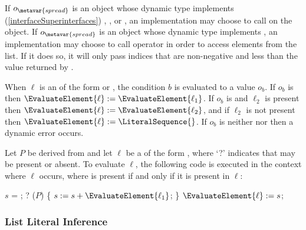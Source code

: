 \documentclass[makeidx]{article}
\begin{document}
{\LMHash{}%
If $o_{\metavar{spread}}$ is an object whose dynamic type implements
(\ref{interfaceSuperinterfaces})
, , or ,
an implementation may choose to call  on the object.
If $o_{\metavar{spread}}$ is an object
whose dynamic type implements ,
an implementation may choose to call operator \lit{[]}
in order to access elements from the list.
If it does so, it will only pass indices
that are non-negative and less than the value returned by .

\EndCase

\LMHash{}%
When $\ell$ is an  of the form
 or
,
the condition $b$ is evaluated to a value $o_b$.
If $o_b$ is \TRUE{} then
$\EvaluateElement{\ell} := \EvaluateElement{\ell_1}$.
If $o_b$ is \FALSE{} and $\ell_2$ is present then
$\EvaluateElement{\ell} := \EvaluateElement{\ell_2}$,
and if $\ell_2$ is not present then
$\EvaluateElement{\ell} := \LiteralSequence{}$.
If $o_b$ is neither \TRUE{} nor \FALSE{} then a dynamic error occurs.
\EndCase

\LMHash{}%
Let $P$ be derived from  and
let $\ell$ be a  of the form
,
where `\AWAIT?' indicates that \AWAIT{} may be present or absent.
To evaluate $\ell$,
the following code is executed in the context where $\ell$ occurs,
where \AWAIT{} is present if and only if it is present in $\ell$:

\vspace{-2ex}\begin{minipage}[t]{\textwidth}
\begin{normativeDartCode}
\VAR{} $s$ = \LiteralSequence;
\AWAIT? \FOR{} ($P$) \{
  $s := s + \EvaluateElement{\ell_1}$;
\}
$\EvaluateElement{\ell} := s$;
\end{normativeDartCode}
\end{minipage}
\EndCase


\subsubsection{List Literal Inference}

}
\end{document}
